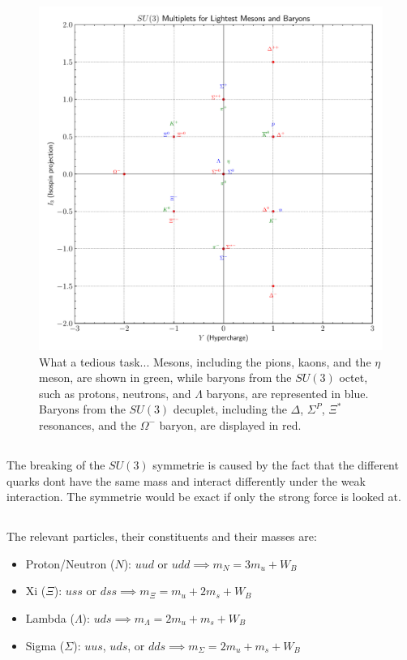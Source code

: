 \documentclass[exb,en]{exercise_5.0}
\begin{document}
\begin{figure}[H]
    \centering
    \includegraphics[width=1.0\textwidth]{tmp.pdf}
    \caption{What a tedious task... Mesons, including the pions, kaons, and the $\eta$ meson, are shown in green, while baryons from the $SU(3)$ octet, such as protons, neutrons, and $\Lambda$ baryons, are represented in blue. Baryons from the $SU(3)$ decuplet, including the $\Delta$, $\Sigma^P$, $\Xi^*$ resonances, and the $\Omega^-$ baryon, are displayed in red.}
\end{figure}

\subsection{}
The breaking of the $SU(3)$ symmetrie is caused by the fact that the different quarks dont have the same mass and interact differently under the weak interaction. The symmetrie would be exact if only the strong force is  looked at.

\subsection{}
The relevant particles, their constituents and their masses are:
\begin{itemize}
    \item {Proton/Neutron (\(N\))}: \(uud\) or \(udd\implies m_N=3 m_u + W_B\)
    \item {Xi (\(\Xi\))}: \(uss\) or \(dss\implies m_\Xi=m_u + 2m_s + W_B\)
    \item {Lambda (\(\Lambda\))}: \(uds\implies m_\Lambda= 2m_u + m_s+ W_B\)
    \item {Sigma (\(\Sigma\))}: \(uus\), \(uds\), or \(dds\implies m_\Sigma=2 m_u + m_s + W_B\)
\end{itemize}
\end{document}
